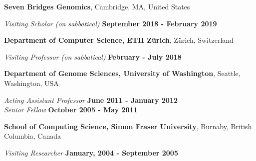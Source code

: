 \documentclass[margin,line]{res}
\newcommand{\junk}[1]{}
\begin{document}
\begin{resume}
            
    {\bf Seven Bridges Genomics}, Cambridge, MA, United States    
          
    \vspace{-.3cm}
        {\em Visiting Scholar (on sabbatical)} \hfill {\bf September 2018 - February 2019} 

    {\bf Department of Computer Science, ETH Zürich}, Zürich, Switzerland
                  
    \vspace{-.3cm}
        {\em Visiting Professor (on sabbatical)} \hfill {\bf February - July 2018} 
                         
    {\bf Department of Genome Sciences, University of Washington}, Seattle, Washington, USA
                         
    \vspace{-.3cm}
        {\em Acting Assistant Professor} \hfill {\bf June 2011 - January 2012} \\                           
        {\em Senior Fellow} \hfill {\bf October 2005 - May 2011}
                                       
    {\bf School of Computing Science, Simon Fraser University}, Burnaby, British Columbia, Canada

    \vspace{-.3cm}
        {\em Visiting Researcher} \hfill {\bf January, 2004 - September 2005}\\
                                         \junk{
                                         Worked on RNA-RNA interaction prediction algorithms and RNA secondary structure
                                         motif discovery problems, collaborating with Peter Unrau, Kaizhong
                                         Zhang, and Jeremy Buhler.
                                         }
                                                                              

\end{resume}
\end{document}
